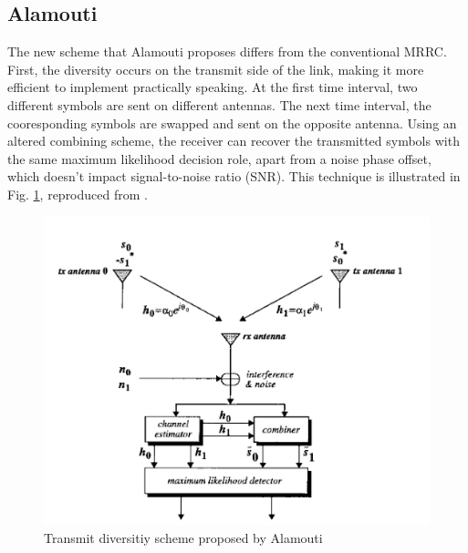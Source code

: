 \documentclass[conference]{IEEEtran}
\begin{document}
\subsection{Alamouti}
The new scheme that Alamouti proposes differs from the conventional MRRC. First, the diversity occurs on the transmit side of the link, making it more efficient to implement practically speaking. At the first time interval, two different symbols are sent on different antennas. The next time interval, the cooresponding symbols are swapped and sent on the opposite antenna. Using an altered combining scheme, the receiver can recover the transmitted symbols with the same maximum likelihood decision role, apart from a noise phase offset, which doesn't impact signal-to-noise ratio (SNR). This technique is illustrated in Fig. \ref{fig:alamouti}, reproduced from \cite{alamouti}.
\begin{figure}[htbp]
\centerline{\includegraphics[scale=.6]{./media/alamouti.png}}
\caption{Transmit diversitiy scheme proposed by Alamouti}
\label{fig:alamouti}
\end{figure}
\end{document}
